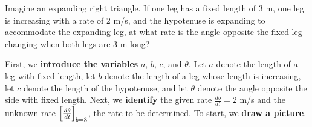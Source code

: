 \documentclass{ximera}
\begin{document}
\begin{example}
  Imagine an expanding right triangle. If one leg has a fixed length
  of $3$ m, one leg is increasing with a rate of $2$ m/s, and the
  hypotenuse is expanding to accommodate the expanding leg, at what
  rate is the angle opposite the fixed leg changing when both legs
  are $3$ m long?
  \begin{explanation}
  First, we \textbf{introduce the variables}  $a$, $b$, $c$, and $\theta$. Let $a$ denote the length of a leg with fixed length, let $b$ denote the length of a leg whose length is increasing, 
  let $c$ denote the length of the hypotenuse, and let $\theta$ denote the angle opposite the side with fixed length. Next, we \textbf{identify} the given rate $\frac{db}{dt}=2$ m/s and the unknown rate $\Bigl[\frac{d\theta}{dt}\Bigr]_{b=3}$, the rate to be determined.
    To start, we \textbf{draw a picture}.
    \begin{image}
    \end{image} 


\end{explanation}
\end{example}
\end{document}
